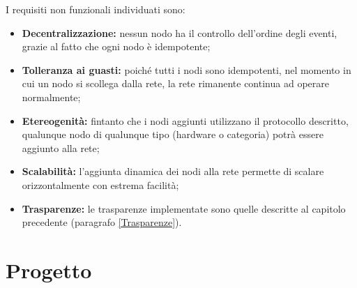 \documentclass[italian]{memoir}
\begin{document}
I requisiti non funzionali individuati sono:
\begin{itemize}
\item \textbf{Decentralizzazione:} nessun nodo ha il controllo dell'ordine degli
	   eventi, grazie al fatto che ogni nodo è idempotente;
\item \textbf{Tolleranza ai guasti:} poiché tutti i nodi sono idempotenti, nel momento
	   in cui un nodo si scollega dalla rete, la rete rimanente continua ad operare
	   normalmente;
\item \textbf{Etereogenità:} fintanto che i nodi aggiunti utilizzano il protocollo
	   descritto, qualunque nodo di qualunque tipo (hardware o categoria) potrà essere
	   aggiunto alla rete;
\item \textbf{Scalabilità:} l'aggiunta dinamica dei nodi alla rete permette di scalare
	   orizzontalmente con estrema facilità;
\item \textbf{Trasparenze:} le trasparenze implementate sono quelle descritte al
	   capitolo precedente (paragrafo \ref{Trasparenze}).
\end{itemize}

%
%
%
%
%



\chapter{Progetto}\label{ch:progetto}
\end{document}
